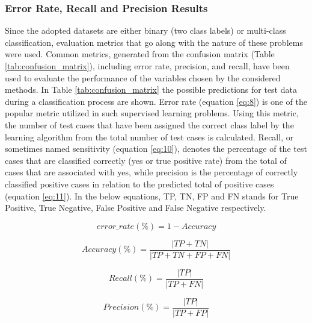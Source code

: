 \documentclass[review]{elsarticle}
\begin{document}
\subsubsection{Error Rate, Recall and Precision Results }

Since the adopted datasets are either binary (two class labels) or multi-class classification, evaluation metrics that go along with the nature of these problems were used. Common metrics, generated from the confusion matrix (Table \ref{tab:confusion_matrix}), including error rate, precision, and recall, have been used to evaluate the performance of the variables chosen by the considered methods. In Table \ref{tab:confusion_matrix} the possible predictions for test data during a classification process are shown. Error rate (equation \ref{eq:8}) is one of the popular metric utilized in such supervised learning problems. Using this metric, the number of test cases that have been assigned the correct class label by the learning algorithm from the total number of test cases is calculated. Recall, or sometimes named sensitivity  (equation \ref{eq:10}), denotes the percentage of the test cases that are classified correctly (yes or true positive rate) from the total of cases that are associated with yes, while precision is the percentage of correctly classified positive cases in relation to the predicted total of positive cases (equation \ref{eq:11}). In the below equations, TP, TN, FP and FN stands for True Positive, True Negative, False Positive and False Negative respectively. 

\begin{equation}\label{eq:error_rate}
error\_rate(\%) = 1- Accuracy
\end{equation}


\begin{equation}\label{eq:accuracy}
Accuracy(\%) = \frac{|TP + TN|}{|TP + TN + FP + FN|}
\end{equation}

\begin{equation}\label{eq:recall}
Recall(\%) = \frac{|TP|}{|TP + FN|} 
\end{equation}


\begin{equation}\label{eq:precision}
Precision(\%) = \frac{|TP|}{|TP + FP|} 
\end{equation}
\end{document}
